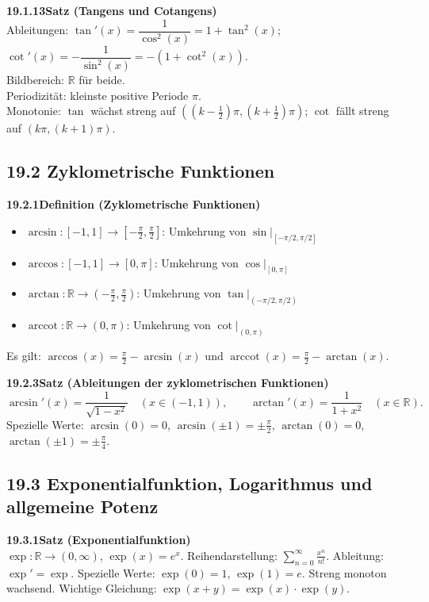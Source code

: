 \documentclass[a4paper,12pt]{article}
\newcommand{\gentry}[3]{%
  \noindent\textbf{#1\quad #2}\nopagebreak\\[0.2em]
  #3\par\smallskip
}
\begin{document}
\gentry{19.1.13}{Satz (Tangens und Cotangens)}{%
  Ableitungen: $\tan'(x) = \dfrac{1}{\cos^2(x)} = 1+\tan^2(x)$;\quad
  $\cot'(x) = -\dfrac{1}{\sin^2(x)} = -(1+\cot^2(x))$.\\
  Bildbereich: $\mathbb{R}$ für beide.\\
  Periodizität: kleinste positive Periode $\pi$.\\
  Monotonie: $\tan$ wächst streng auf $((k-\tfrac{1}{2})\pi,(k+\tfrac{1}{2})\pi)$;
  $\cot$ fällt streng auf $(k\pi,(k+1)\pi)$.
}

\subsection*{19.2 \quad Zyklometrische Funktionen}

\gentry{19.2.1}{Definition (Zyklometrische Funktionen)}{%
  \begin{itemize}[topsep=2pt,itemsep=1pt]
    \item $\arcsin:[{-1,1}] \to [{-\tfrac{\pi}{2},\tfrac{\pi}{2}}]$: Umkehrung von $\sin|_{[-\pi/2,\pi/2]}$
    \item $\arccos:[{-1,1}] \to [{0,\pi}]$: Umkehrung von $\cos|_{[0,\pi]}$
    \item $\arctan:\mathbb{R} \to ({-\tfrac{\pi}{2},\tfrac{\pi}{2}})$: Umkehrung von $\tan|_{(-\pi/2,\pi/2)}$
    \item $\operatorname{arccot}:\mathbb{R} \to (0,\pi)$: Umkehrung von $\cot|_{(0,\pi)}$
  \end{itemize}
  Es gilt: $\arccos(x) = \tfrac{\pi}{2} - \arcsin(x)$ und
  $\operatorname{arccot}(x) = \tfrac{\pi}{2} - \arctan(x)$.
}

\gentry{19.2.3}{Satz (Ableitungen der zyklometrischen Funktionen)}{%
  \[
    \arcsin'(x) = \frac{1}{\sqrt{1-x^2}} \quad (x\in(-1,1)), \qquad
    \arctan'(x) = \frac{1}{1+x^2} \quad (x\in\mathbb{R}).
  \]
  Spezielle Werte: $\arcsin(0)=0$, $\arcsin(\pm 1)=\pm\tfrac{\pi}{2}$,
  $\arctan(0)=0$, $\arctan(\pm 1) = \pm\tfrac{\pi}{4}$.
}

\subsection*{19.3 \quad Exponentialfunktion, Logarithmus und allgemeine Potenz}

\gentry{19.3.1}{Satz (Exponentialfunktion)}{%
  $\exp:\mathbb{R}\to(0,\infty)$, $\exp(x)=e^x$. Reihendarstellung: $\sum_{n=0}^{\infty}\frac{x^n}{n!}$.
  Ableitung: $\exp'=\exp$. Spezielle Werte: $\exp(0)=1$, $\exp(1)=e$.
  Streng monoton wachsend. Wichtige Gleichung: $\exp(x+y)=\exp(x)\cdot\exp(y)$.
}
\end{document}
